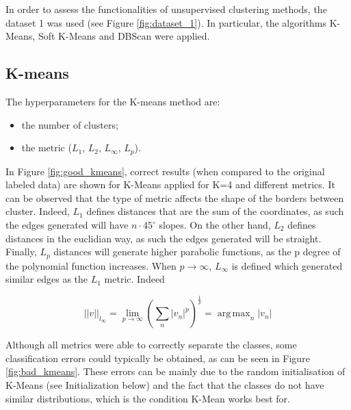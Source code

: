 \documentclass[a4paper,10pt]{article}
\DeclareMathOperator*{\argmax}{arg\,max}
\begin{document}

In order to assess the functionalities of unsupervised clustering methods, the dataset 1 was used (see Figure \ref{fig:dataset_1}). In particular, the algorithms K-Means, Soft K-Means and DBScan were applied.

\subsection{K-means}

The hyperparameters for the K-means method are:
\begin{itemize}
\item the number of clusters;
\item the metric ($L_1$, $L_2$, $L_{\infty}$, $L_p$).
\end{itemize}

In Figure \ref{fig:good_kmeans}, correct results (when compared to the original labeled data) are shown for K-Means applied for K=4 and different metrics. It can be observed that the type of metric affects the shape of the borders between cluster. Indeed, $L_1$ defines distances that are the sum of the coordinates, as such the edges generated will have $n\cdot 45^{\circ}$ slopes. On the other hand, $L_2$ defines distances in the euclidian way, as such the edges generated will be straight. Finally, $L_p$ distances will generate higher parabolic functions, as the p degree of the polynomial function increases. When $p\rightarrow\infty$, $L_{\infty}$ is defined which generated similar edges as the $L_1$ metric. Indeed 

\begin{equation}
||v||_{l_\infty} = \lim_{p \rightarrow \infty }\left(\sum_{n} |v_n|^p \right)^{\frac{1}{p}}=  \argmax_{n} {|v_n|}
\end{equation}

Although all metrics were able to correctly separate the classes, some classification errors could typically be obtained, as can be seen in Figure \ref{fig:bad_kmeans}. These errors can be mainly due to the random initialisation of K-Means (see Initialization below) and the fact that the classes do not have similar distributions, which is the condition K-Mean works best for. 
\end{document}
